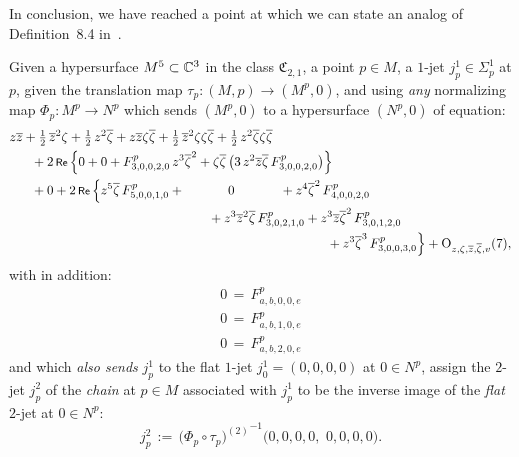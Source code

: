 \documentclass[12pt,twoside,leqno,openany]{amsart}
\makeatletter
\newcommand{\reqnomode}{\tagsleft@false}\makeatother
\makeatother
\begin{document}
In conclusion, we have reached
a point at which we can state an analog of 
Definition~8.4 in~{\cite{Merker-2020}}.

\begin{Definition}
\label{Def-2-jet-chain-pullback-flat-M5-C3}
Given a hypersurface $M^5 \subset \mathbb{C}^3$
in the class $\mathfrak{C}_{2,1}$, a point $p \in M$,
a $1$-jet $j_p^1 \in \Sigma_p^1$ at $p$, 
given 
the translation map $\tau_p \colon (M,p) 
\longrightarrow (M^p,0)$, 
and using {\em any} normalizing map $\Phi_p \colon M^p 
\longrightarrow N^p$ which sends $(M^p, 0)$ to
a hypersurface
$(N^p, 0)$ of equation:
\[
\aligned
{}
&
z\overline{z}
+
\tfrac{1}{2}\,\overline{z}^2\zeta
+
\tfrac{1}{2}\,z^2\overline{\zeta}
+
z\overline{z}\zeta\overline{\zeta}
+
\tfrac{1}{2}\,\overline{z}^2\zeta\zeta\overline{\zeta}
+
\tfrac{1}{2}\,z^2\overline{\zeta}\zeta\overline{\zeta}
\\
&
\ \ \ \ \
+
2\,\Re\,
\Big\{
0
+
0
+
F_{3,0,0,2,0}^p\,z^3\overline{\zeta}^2
+
\zeta\overline{\zeta}\,
\big(
3\,z^2\overline{z}\overline{\zeta}\,
F_{3,0,0,2,0}^p
\big)
\Big\}
\\
&
\ \ \ \ \
+
0
+
2\,\Re\,\Big\{
z^5\overline{\zeta}\,
F_{5,0,0,1,0}^p
+
\ \ \ \ \ \ \ \ \ \
0
\ \ \ \ \ \ \ \ \ \ \,
+
z^4\overline{\zeta}^2\,
F_{4,0,0,2,0}^p
\\
&
\ \ \ \ \ \ \ \ \ \ \ \ \ \ \ \ \ \ \ \ \ \ \ \ \ \ \ \ \ \ \ \ \ \ \
\ \ \ \ \ \ \ \ \ \ \ 
+
z^3\overline{z}^2\overline{\zeta}\,
F_{3,0,2,1,0}^p
+
z^3\overline{z}\overline{\zeta}^2\,
F_{3,0,1,2,0}^p
\\
&
\ \ \ \ \ \ \ \ \ \ \ \ \ \ \ \ \ \ \ \ \ \ \ \ \ \ \ \ \ \ \ \ \ \ \
\ \ \ \ \ \ \ \ \ \ \ \ \ \ \ \ \ \ \ \ \ \ \ \ \ \ \ 
\ \ \ \ \ \ \ \ \ \ \ \,
+
z^3\overline{\zeta}^3\,
F_{3,0,0,3,0}^p
\Big\}
+
{\rm O}_{z,\zeta,\overline{z},\overline{\zeta},v}(7),
\endaligned
\]
with in addition:
\reqnomode{}
\begin{align}
0
\,=\,
F_{a,b,0,0,e}^p
\tag{(a+b+2e=7),}
\\
0
\,=\,
F_{a,b,1,0,e}^p
\tag{(a+b+2e=6),}
\\
0
\,=\,
F_{a,b,2,0,e}^p
\tag{(a+b+2e=5),}
\end{align}
and which {\em also sends} $j_p^1$ to the flat $1$-jet
$j_0^1 = (0, 0, 0, 0)$ at $0 \in N^p$, 
assign the $2$-jet $j_p^2$
of the {\sl chain} at $p \in M$ associated with $j_p^1$ 
to be
the inverse image of the {\em flat} $2$-jet at $0 \in N^p$:
\[
j_p^2
\,:=\,
{\big(\Phi_p\circ\tau_p\big)^{(2)}}^{-1}
\big(0,0,0,0,\,\,0,0,0,0\big).
\]
\end{Definition}
\end{document}
